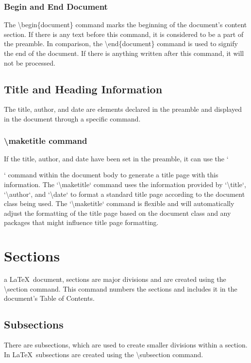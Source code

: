 \documentclass[12pt,journal,compsoc]{IEEEtran}
\begin{document}
\subsubsection{Begin and End Document}
The \textbackslash begin\{document\} command marks the beginning of the document's content section. If there is any text before this command, it is considered to be a part of the preamble.  In comparison, the \textbackslash end\{document\} command is used to signify the end of the document. If there is anything written after this command, it will not be processed.

\subsection{Title and Heading Information}
The title, author, and date are elements declared in the preamble and displayed in the document through a specific command.

\subsubsection{\textbackslash maketitle command}
If the title, author, and date have been set in the preamble, it can use the `\maketitle` command within the document body to generate a title page with this information. The `\textbackslash{}maketitle` command uses the information provided by `\textbackslash{}title`, `\textbackslash{}author`, and `\textbackslash{}date` to format a standard title page according to the document class being used. The `\textbackslash{}maketitle` command is flexible and will automatically adjust the formatting of the title page based on the document class and any packages that might influence title page formatting. 

\section{Sections}
 a \LaTeX\ document, sections are major divisions and are created using the \textbackslash{}section command. This command numbers the sections and includes it in the document’s Table of Contents.

\subsection{Subsections}
There are subsections, which are used to create smaller divisions within a section. In \LaTeX\, subsections are created using the \textbackslash{}subsection command.
\end{document}
